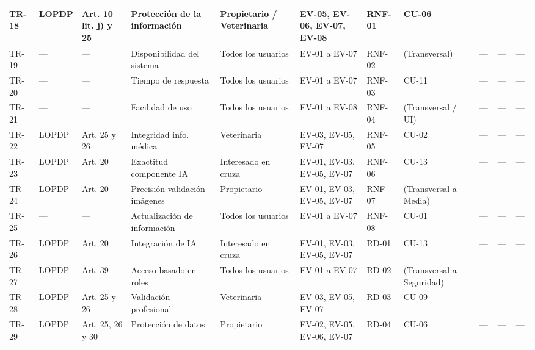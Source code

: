 \documentclass[journal,onecolumn]{IEEEtran}
\begin{document}
\begin{landscape}
\begin{longtable}{@{}p{0.8cm} p{1.3cm} p{1.5cm} p{2.2cm} p{1.5cm} p{1.8cm} p{1.6cm} p{1.3cm} p{1.3cm} p{1.3cm} p{1.5cm}@{}}
			TR-18 & LOPDP & Art. 10 lit. j) y 25 & Protección de la información & Propietario / Veterinaria & EV-05, EV-06, EV-07, EV-08 & RNF-01 & CU-06 & --- & --- & --- \\ \midrule
			
			TR-19 & --- & --- & Disponibilidad del sistema & Todos los usuarios & EV-01 a EV-07 & RNF-02 & (Transversal) & --- & --- & --- \\ \midrule
			
			TR-20 & --- & --- & Tiempo de respuesta & Todos los usuarios & EV-01 a EV-07 & RNF-03 & CU-11 & --- & --- & --- \\ \midrule
			
			TR-21 & --- & --- & Facilidad de uso & Todos los usuarios & EV-01 a EV-08 & RNF-04 & (Transversal / UI) & --- & --- & --- \\ \midrule
			
			TR-22 & LOPDP & Art. 25 y 26 & Integridad info. médica & Veterinaria & EV-03, EV-05, EV-07 & RNF-05 & CU-02 & --- & --- & --- \\ \midrule
			
			TR-23 & LOPDP & Art. 20 & Exactitud componente IA & Interesado en cruza & EV-01, EV-03, EV-05, EV-07 & RNF-06 & CU-13 & --- & --- & --- \\ \midrule
			
			TR-24 & LOPDP & Art. 20 & Precisión validación imágenes & Propietario & EV-01, EV-03, EV-05, EV-07 & RNF-07 & (Transversal a Media) & --- & --- & --- \\ \midrule
			
			TR-25 & --- & --- & Actualización de información & Todos los usuarios & EV-01 a EV-07 & RNF-08 & CU-01 & --- & --- & --- \\ \midrule
			
			TR-26 & LOPDP & Art. 20 & Integración de IA & Interesado en cruza & EV-01, EV-03, EV-05, EV-07 & RD-01 & CU-13 & --- & --- & --- \\ \midrule
			
			TR-27 & LOPDP & Art. 39 & Acceso basado en roles & Todos los usuarios & EV-01 a EV-07 & RD-02 & (Transversal a Seguridad) & --- & --- & --- \\ \midrule
			
			TR-28 & LOPDP & Art. 25 y 26 & Validación profesional & Veterinaria & EV-03, EV-05, EV-07 & RD-03 & CU-09 & --- & --- & --- \\ \midrule
			
			TR-29 & LOPDP & Art. 25, 26 y 30 & Protección de datos & Propietario & EV-02, EV-05, EV-06, EV-07 & RD-04 & CU-06 & --- & --- & --- \\ \midrule
			

\end{longtable}
\end{landscape}
\end{document}
